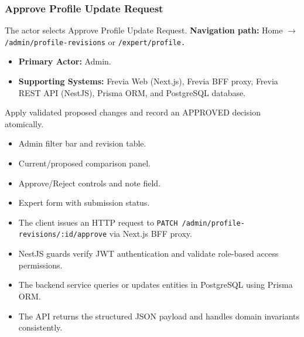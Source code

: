 \subsubsection{Approve Profile Update Request}

The actor selects Approve Profile Update Request.\newline
\textbf{Navigation path:} Home $\rightarrow$ \texttt{/\allowbreak{}admin/\allowbreak{}profile-\allowbreak{}revisions} or \texttt{/\allowbreak{}expert/\allowbreak{}profile.}


\begin{itemize}[leftmargin=1.6em,topsep=3pt,itemsep=2pt,parsep=0pt,label=$\bullet$]
    \item \textbf{Primary Actor:} Admin.
    \item \textbf{Supporting Systems:} Frevia Web (Next.js), Frevia BFF proxy, Frevia REST API (NestJS), Prisma ORM, and PostgreSQL database.
\end{itemize}

\noindent Apply validated proposed changes and record an APPROVED decision atomically.

\begin{itemize}[leftmargin=1.6em,topsep=3pt,itemsep=2pt,parsep=0pt,label=$\bullet$]
    \item Admin filter bar and revision table.
    \item Current/proposed comparison panel.
    \item Approve/Reject controls and note field.
    \item Expert form with submission status.
\end{itemize}

\begin{itemize}[leftmargin=1.6em,topsep=3pt,itemsep=2pt,parsep=0pt,label=$\bullet$]
    \item The client issues an HTTP request to \texttt{PATCH /\allowbreak{}admin/\allowbreak{}profile-\allowbreak{}revisions/\allowbreak{}:\allowbreak{}id/\allowbreak{}approve} via Next.js BFF proxy.
    \item NestJS guards verify JWT authentication and validate role-based access permissions.
    \item The backend service queries or updates entities in PostgreSQL using Prisma ORM.
    \item The API returns the structured JSON payload and handles domain invariants consistently.
\end{itemize}

